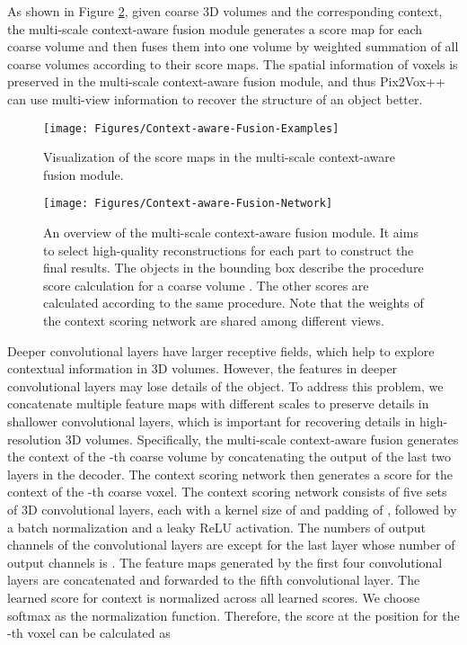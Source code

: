 \documentclass[twocolumn]{svjour3}
\begin{document}
As shown in Figure \ref{fig:context-aware-fusion-network-architecture}, given coarse 3D volumes and the corresponding context, the multi-scale context-aware fusion module generates a score map for each coarse volume and then fuses them into one volume by weighted summation of all coarse volumes according to their score maps.
The spatial information of voxels is preserved in the multi-scale context-aware fusion module, and thus Pix2Vox++ can use multi-view information to recover the structure of an object better.

\begin{figure}[!t]
  \centering
  \resizebox{\linewidth}{!} {
    \texttt{[image: Figures/Context-aware-Fusion-Examples]}
  }
  \caption{Visualization of the score maps in the multi-scale context-aware fusion module.}
  \label{fig:context-aware-fusion-examples}
\end{figure}

\begin{figure}[!t]
  \centering
  \resizebox{\linewidth}{!} {
    \texttt{[image: Figures/Context-aware-Fusion-Network]}
  }
  \caption{An overview of the multi-scale context-aware fusion module. It aims to select high-quality reconstructions for each part to construct the final results. The objects in the bounding box describe the procedure score calculation for a coarse volume . The other scores are calculated according to the same procedure. Note that the weights of the context scoring network are shared among different views.}
  \label{fig:context-aware-fusion-network-architecture}
\end{figure}

Deeper convolutional layers have larger receptive fields, which help to explore contextual information in 3D volumes.
However, the features in deeper convolutional layers may lose details of the object.
To address this problem, we concatenate multiple feature maps with different scales to preserve details in shallower convolutional layers, which is important for recovering details in high-resolution 3D volumes.
Specifically, the multi-scale context-aware fusion generates the context  of the -th coarse volume  by concatenating the output of the last two layers in the decoder.
The context scoring network then generates a score  for the context of the -th coarse voxel.
The context scoring network consists of five sets of 3D convolutional layers, each with a kernel size of  and padding of , followed by a batch normalization and a leaky ReLU activation.
The numbers of output channels of the convolutional layers are  except for the last layer whose number of output channels is .
The feature maps generated by the first four convolutional layers are concatenated and forwarded to the fifth convolutional layer.
The learned score  for context  is normalized across all learned scores.
We choose softmax as the normalization function. 
Therefore, the score  at the position  for the -th voxel can be calculated as 
\end{document}
